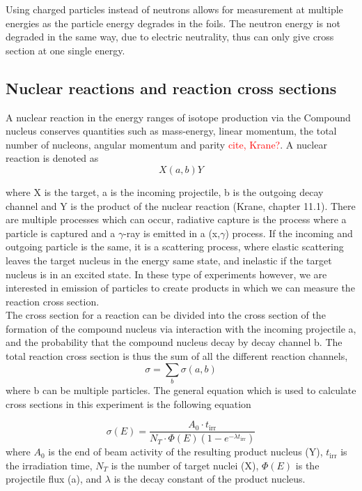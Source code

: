 \documentclass[a4paper,11pt,twoside]{book}
\begin{document}
Using charged particles instead of neutrons allows for measurement at multiple energies as the particle energy degrades in the foils. The neutron energy is not degraded in the same way, due to electric neutrality, thus can only give cross section at one single energy. 







\subsection{Nuclear reactions and reaction cross sections}

A nuclear reaction in the energy ranges of isotope production via the Compound nucleus conserves quantities such as mass-energy, linear momentum, the total number of nucleons, angular momentum and parity \textcolor{red}{cite, Krane?}. A nuclear reaction is denoted as
\begin{equation}
    X(a,b)Y
\end{equation}

\noindent where X is the target, a is the incoming projectile, b is the outgoing decay channel and Y is the product of the nuclear reaction (Krane, chapter 11.1). There are multiple processes which can occur, radiative capture is the process where a particle is captured and a $\gamma$-ray is emitted in a (x,$\gamma$) process. If the incoming and outgoing particle is the same, it is a scattering process, where elastic scattering leaves the target nucleus in the energy same state, and inelastic if the target nucleus is in an excited state. In these type of experiments however, we are interested in emission of particles to create products in which we can measure the reaction cross section. \\

\noindent 
The cross section for a reaction can be divided into the cross section of the formation of the compound nucleus via interaction with the incoming projectile a, and the probability that the compound nucleus decay by decay channel b. The total reaction cross section is thus the sum of all the different reaction channels, 
\begin{equation}
    \sigma = \sum_b \sigma(a,b)
\end{equation}
where b can be multiple particles. The general equation which is used to calculate cross sections in this experiment is the following equation

\begin{equation}
    \sigma(E) = \frac{A_0 \cdot t_\text{irr}}{N_T \cdot \Phi(E)(1-e^{-\lambda t_\text{irr}})}
\end{equation}
\noindent where $A_0$ is the end of beam activity of the resulting product nucleus (Y), $t_\text{irr}$ is the irradiation time, $N_T$ is the number of target nuclei (X), $\Phi(E)$ is the projectile flux (a), and $\lambda$ is the decay constant of the product nucleus. \\ 
\end{document}
